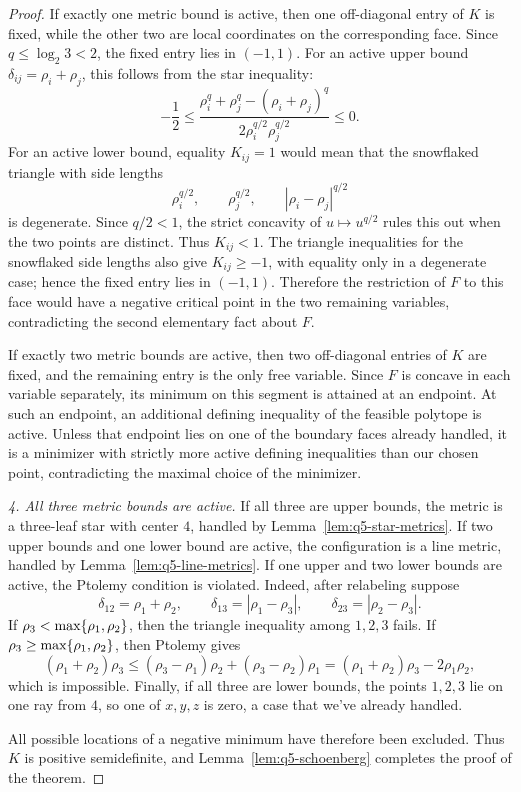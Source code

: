 \documentclass[12pt]{amsart}
\theoremstyle{definition}
\newcommand{\1}{\mathbf{1}}
\renewcommand\max{\textup{max}}
\begin{document}
\begin{proof}
If exactly one metric bound is active, then one off-diagonal entry of $K$ is fixed,
while the other two are local coordinates on the corresponding face.  Since
$q\le\log_2 3<2$, the fixed entry lies in $(-1,1)$.  For an active upper bound
$\delta_{ij}=\rho_i+\rho_j$, this follows from the star inequality:
\[
        -\frac12
        \le
        \frac{\rho_i^q+\rho_j^q-(\rho_i+\rho_j)^q}
        {2\rho_i^{q/2}\rho_j^{q/2}}
        \le 0.
\]
For an active lower bound, equality $K_{ij}=1$ would mean that the snowflaked triangle
with side lengths
\[
        \rho_i^{q/2},\qquad \rho_j^{q/2},\qquad |\rho_i-\rho_j|^{q/2}
\]
is degenerate.  Since $q/2<1$, the strict concavity of $u\mapsto u^{q/2}$ rules this
out when the two points are distinct.  Thus $K_{ij}<1$.  The triangle inequalities for
the snowflaked side lengths also give $K_{ij}\ge -1$, with equality only in a degenerate
case; hence the fixed entry lies in $(-1,1)$.  Therefore the restriction of $F$ to
this face would have a negative critical point in the two remaining variables,
contradicting the second elementary fact about $F$.

If exactly two metric bounds are active, then two off-diagonal entries of $K$ are
fixed, and the remaining entry is the only free variable.  Since $F$ is concave in
each variable separately, its minimum on this segment is attained at an endpoint.  At
such an endpoint, an additional defining inequality of the feasible polytope is active.
Unless that endpoint lies on one of the boundary faces already handled, it is a minimizer
with strictly more active defining inequalities than our chosen point, contradicting the
maximal choice of the minimizer.

\smallskip
\noindent\emph{4. All three metric bounds are active.}
If all three are upper bounds, the metric is a three-leaf star with center $4$, handled
by Lemma~\ref{lem:q5-star-metrics}.  If two upper bounds and one lower bound are active,
the configuration is a line metric, handled by Lemma~\ref{lem:q5-line-metrics}.  If one
upper and two lower bounds are active, the Ptolemy condition is violated.  Indeed, after relabeling
suppose
\[
        \delta_{12}=\rho_1+\rho_2,\qquad
        \delta_{13}=|\rho_1-\rho_3|,\qquad
        \delta_{23}=|\rho_2-\rho_3|.
\]
If $\rho_3<\max\{\rho_1,\rho_2\}$, then the triangle inequality among $1,2,3$
fails.  If $\rho_3\ge\max\{\rho_1,\rho_2\}$, then Ptolemy gives
\[
        (\rho_1+\rho_2)\rho_3
        \le
        (\rho_3-\rho_1)\rho_2+(\rho_3-\rho_2)\rho_1
        =
        (\rho_1+\rho_2)\rho_3-2\rho_1\rho_2,
\]
which is impossible.  Finally, if all three are lower bounds, the points $1,2,3$ lie on one
ray from $4$, so one of $x,y,z$ is zero, a case that we've already handled.

All possible locations of a negative minimum have therefore been excluded.  Thus $K$ is
positive semidefinite, and Lemma~\ref{lem:q5-schoenberg} completes the proof of the theorem.
\end{proof}
\end{document}
